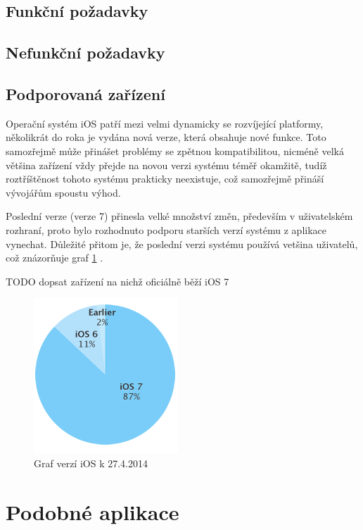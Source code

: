 \documentclass[thesis=B,czech]{FITthesis}[2012/06/26]
\begin{document}
\subsection{Funkční požadavky}

\subsection{Nefunkční požadavky}

\subsection{Podporovaná zařízení}

	Operační systém iOS patří mezi velmi dynamicky se rozvíjející platformy, několikrát do roka je vydána nová verze, která obsahuje nové funkce. Toto samozřejmě může přinášet problémy se zpětnou kompatibilitou, nicméně velká většina zařízení vždy přejde na novou verzi systému téměř okamžitě, tudíž roztříštěnost tohoto systému prakticky neexistuje, což samozřejmě přináší vývojářům spoustu výhod.

	Poslední verze (verze 7) přinesla velké množství změn, především v uživatelském rozhraní, proto bylo rozhodnuto podporu starších verzí systému z aplikace vynechat. Důležité přitom je, že poslední verzi systému používá vetšina uživatelů, což znázorňuje graf \ref{graph:ios7_stats} \cite{devAppleStats}.

	{\LARGE TODO dopsat zařízení na nichž oficiálně běží iOS 7}

	\begin{figure}
		\centering
		\includegraphics{img/ios7stats}
		\caption{Graf verzí iOS k 27.4.2014}\label{graph:ios7_stats}
	\end{figure}

\section{Podobné aplikace}\label{sec:competition}
\end{document}
